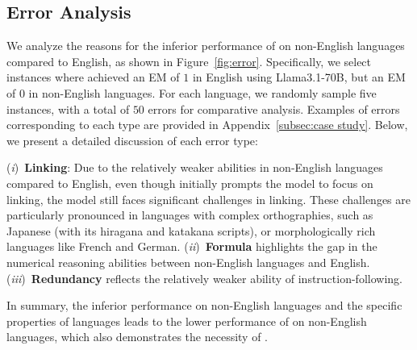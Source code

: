 \subsection{Error Analysis}
\label{subsec:Error Analysis}
We analyze the reasons for the inferior performance of \ourmethod on non-English languages compared to English, as shown in Figure~\ref{fig:error}. 
Specifically, we select instances where \ourmethod achieved an EM of $1$ in English using Llama3.1-70B, but an EM of $0$ in non-English languages. 
For each language, we randomly sample five instances, with a total of $50$ errors for comparative analysis. 
Examples of errors corresponding to each type are provided in Appendix~\ref{subsec:case study}. 
Below, we present a detailed discussion of each error type:

(\emph{i})~\textbf{Linking}: 
Due to the relatively weaker abilities in non-English languages compared to English, even though \ourmethod initially prompts the model to focus on linking, the model still faces significant challenges in linking. 
These challenges are particularly pronounced in languages with complex orthographies, such as Japanese (with its hiragana and katakana scripts), or morphologically rich languages like French and German.
(\emph{ii})~\textbf{Formula} 
highlights the gap in the numerical reasoning abilities between non-English languages and English.
(\emph{iii})~\textbf{Redundancy}  
reflects the relatively weaker ability of instruction-following.

In summary, the inferior performance on non-English languages and the specific properties of languages leads to the lower performance of \ourmethod on non-English languages, which also demonstrates the necessity of \ourdataset.